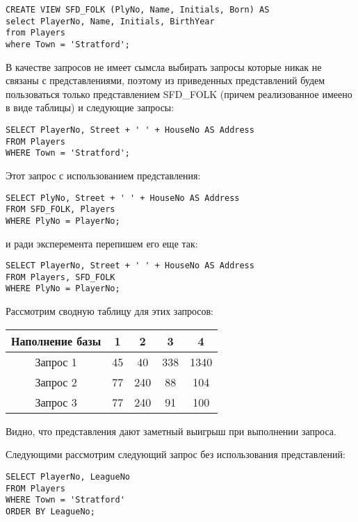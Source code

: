 \documentclass[a4paper,12pt]{article}
\begin{document}
\begin{lstlisting}
CREATE VIEW SFD_FOLK (PlyNo, Name, Initials, Born) AS
select PlayerNo, Name, Initials, BirthYear
from Players
where Town = 'Stratford';
\end{lstlisting}

В качестве запросов не имеет сымсла выбирать запросы которые никак не связаны с представлениями, поэтому из приведенных представлений будем пользоваться только представлением SFD\_FOLK (причем реализованное имеено в виде таблицы) и следующие запросы:

\begin{lstlisting}
SELECT PlayerNo, Street + ' ' + HouseNo AS Address
FROM Players
WHERE Town = 'Stratford';
\end{lstlisting}

Этот запрос с использованием представления:

\begin{lstlisting}
SELECT PlyNo, Street + ' ' + HouseNo AS Address
FROM SFD_FOLK, Players
WHERE PlyNo = PlayerNo;
\end{lstlisting}

и ради эксперемента перепишем его еще так:

\begin{lstlisting}
SELECT PlayerNo, Street + ' ' + HouseNo AS Address
FROM Players, SFD_FOLK
WHERE PlyNo = PlayerNo;
\end{lstlisting}

Рассмотрим сводную таблицу для этих запросов:

\begin{tabular}[t]{|c|c|c|c|c|}
\hline
Наполнение базы &    1 &    2 &    3 &    4 \\
\hline
Запрос 1        &   45 &   40 &  338 & 1340 \\
\hline
Запрос 2        &   77 &  240 &   88 &  104 \\ 
\hline
Запрос 3        &   77 &  240 &   91 &  100 \\
\hline
\end{tabular}

Видно, что представления дают заметный выигрыш при выполнении запроса.

Следующими рассмотрим следующий запрос без использования представлений:

\begin{lstlisting}
SELECT PlayerNo, LeagueNo
FROM Players
WHERE Town = 'Stratford'
ORDER BY LeagueNo;
\end{lstlisting}
\end{document}
